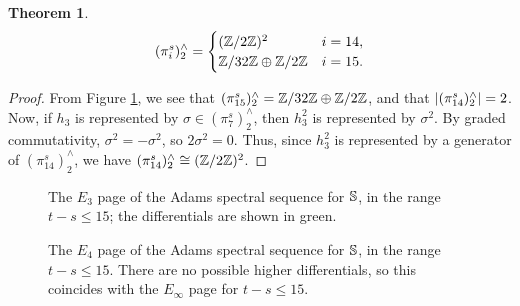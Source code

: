 \documentclass[11pt, titlepage]{article} %
\def\bb{\ensuremath\mathbb}
\def\subq{\ensuremath\subseteq}
\def\inte{\ensuremath\mathbb{Z}}
\DeclareMathOperator{\im}{im}
\numberwithin{equation}{subsection}
\theoremstyle{plain}
\newtheorem{theorem}{Theorem}[subsection]
\theoremstyle{definition}
\begin{document}
\begin{theorem}
\[(\pi_i^s)^\wedge_2=\begin{cases}
(\inte/2\inte)^2 & i = 14,\\
\inte/32\inte \oplus \inte/2\inte & i = 15.
\end{cases}\]
\end{theorem}

\begin{proof}
From Figure \ref{2505051617}, we see that \((\pi_{15}^s)^\wedge_2=\inte/32\inte\oplus\inte/2\inte\), and that \(\lvert(\pi_{14}^s)^\wedge_2\rvert=2\). Now, if \(h_3\) is represented by \(\sigma\in (\pi_7^s)^\wedge_2\), then \(h_3^2\) is represented by \(\sigma^2\). By graded commutativity, \(\sigma^2=-\sigma^2\), so \(2\sigma^2=0\). Thus, since \(h_3^2\) is represented by a generator of \((\pi_{14}^s)^\wedge_2\), we have \((\pi_{14}^s)^\wedge_2\cong (\inte/2\inte)^2\). 
\end{proof}
\begin{figure}
\centering

\caption{The \(E_3\) page of the Adams spectral sequence for \(\bb{S}\), in the range \(t-s\leq 15\); the differentials are shown in green.}
\end{figure}
\begin{figure}
\centering

\caption{The \(E_4\) page of the Adams spectral sequence for \(\bb{S}\), in the range \(t-s\leq 15\). There are no possible higher differentials, so this coincides with the \(E_\infty\) page for \(t-s\leq 15\).}
\label{2505051617}
\end{figure}

\vfill \eject

%                                                                             
%                                                                             



\printbibliography
\end{document}
